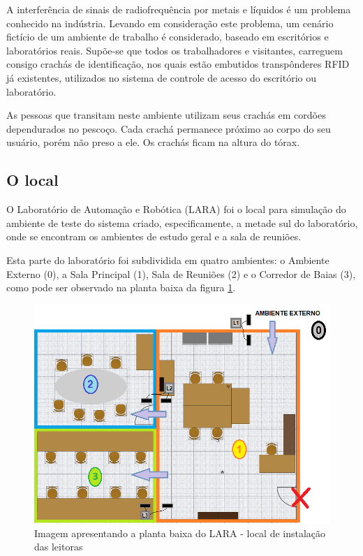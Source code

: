  A interferência de sinais de radiofrequência por metais e líquidos  é um problema conhecido na indústria. Levando em consideração este problema, um cenário fictício de um ambiente de trabalho é considerado, baseado em escritórios e laboratórios reais. Supõe-se que todos os trabalhadores e visitantes, carreguem consigo crachás de identificação, nos quais estão embutidos transpônderes RFID já existentes, utilizados no sistema de controle de acesso do escritório ou laboratório.
 
 As pessoas que transitam neste ambiente utilizam seus crachás em cordões dependurados no pescoço. Cada crachá permanece próximo ao corpo do seu usuário, porém não preso a ele. Os crachás ficam na altura do tórax.
 
 \subsection{O local} \label{section:local}
 

 O Laboratório de Automação e Robótica (LARA) foi o local para simulação do ambiente de teste do sistema criado, especificamente, a metade sul do laboratório, onde se encontram os ambientes de estudo geral e a sala de reuniões.
 
 Esta parte do laboratório foi subdividida em quatro ambientes: o Ambiente Externo (0), a Sala Principal (1), Sala de Reuniões (2) e o Corredor de Baias (3), como pode ser observado na planta baixa da figura \ref{fig:LARA_planta}.

  \begin{figure}[H]
    \centering
    \includegraphics[width=0.7\linewidth]{figs/Metodologia/LARA_planta_ambientes.png}
    \caption{Imagem apresentando a planta baixa do LARA - local de instalação das leitoras}
    \label{fig:LARA_planta}
\end{figure}

